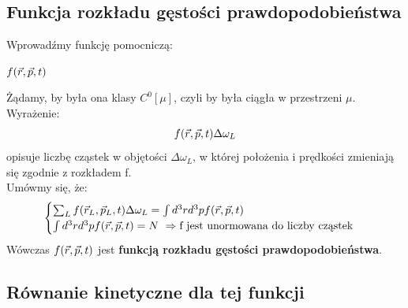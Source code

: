 \subsection{Funkcja rozkładu gęstości prawdopodobieństwa}
Wprowadźmy funkcję pomocniczą:
\begin{center}$f(\vec{r},\vec{p},t)$\end{center}
Żądamy, by była ona klasy $C^0[\mu]$, czyli by była ciągła w przestrzeni $\mu$.
Wyrażenie:
\begin{equation}f(\vec{r},\vec{p},t)\Delta\omega_L\end{equation}
opisuje liczbę cząstek w objętości $\Delta\omega_L$, w której położenia i prędkości zmieniają się zgodnie z rozkładem f.\\
Umówmy się, że:
\begin{equation}
\begin{cases} \sum_L f(\vec{r}_L,\vec{p}_L,t)\Delta\omega_L=\int d^3 r d^3 pf(\vec{r},\vec{p},t) \\ \int d^3r d^3pf(\vec{r},\vec{p},t)=N~\Rightarrow\text{f jest unormowana do liczby cząstek}\end{cases}
\end{equation}
Wówczas $f(\vec{r},\vec{p},t)$ jest \textbf{funkcją rozkładu gęstości prawdopodobieństwa}.
\subsection{Równanie kinetyczne dla tej funkcji}
